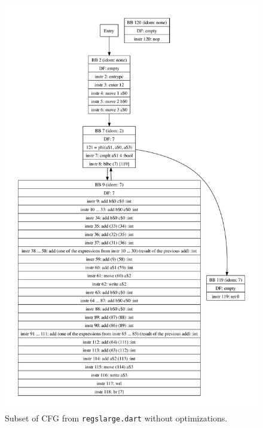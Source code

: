 \documentclass[10pt,twocolumn]{article}
\begin{document}
\begin{figure}
\begin{center}
\vspace{-1in}
  \includegraphics[height=0.75\paperheight]{figs/andre1.pdf}
\begin{minipage}{0.95\columnwidth}
  \caption{\label{fig:regslarge-nothing} Subset of CFG from \texttt{regslarge.dart} without optimizations.}
\end{minipage}
\end{center}
\end{figure}
\end{document}
